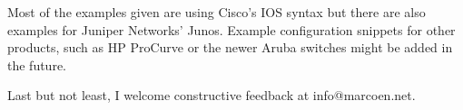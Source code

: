 Most of the examples given are using Cisco's \gls{IOS} syntax but there are also examples for Juniper Networks' Junos.
Example configuration snippets for other products, such as HP ProCurve or the newer Aruba switches might be added in the future.

Last but not least, I welcome constructive feedback at info@\-marcoen.net.
